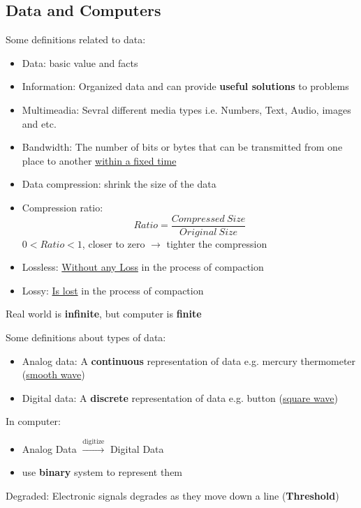 \documentclass[12pt]{article}
\begin{document}
\subsection{Data and Computers}
Some definitions related to data:
\begin{itemize}
    \item Data: basic value and facts
    \item Information: Organized data and can provide \textbf{useful solutions} to problems
    \item Multimeadia: Sevral different media types i.e. Numbers, Text, Audio, images and etc.
    \item Bandwidth: The number of bits or bytes that can be transmitted from one place to 
    another \underline{within a fixed time}
    \item Data compression: shrink the size of the data
    \item Compression ratio:
    \begin{equation}
        Ratio = \frac{Compressed\ Size}{Original\ Size}
    \end{equation}
    $0 < Ratio < 1$, closer to zero $\rightarrow$ tighter the compression
    \item Lossless: \underline{Without any Loss} in the process of compaction
    \item Lossy: \underline{Is lost} in the process of compaction
\end{itemize}

Real world is \textbf{infinite}, but computer is \textbf{finite}

Some definitions about types of data:
\begin{itemize}
    \item Analog data: A \textbf{continuous} representation of data
    e.g. mercury thermometer (\underline{smooth wave})
    \item Digital data: A \textbf{discrete} representation of data
    e.g. button (\underline{square wave})
\end{itemize}

In computer:
\begin{itemize}
    \item Analog Data $\xrightarrow{\text{digitize}}$ Digital Data 
    \item use \textbf{binary} system to represent them     
\end{itemize}

Degraded: Electronic signals degrades as they move down a line (\textbf{Threshold})
\end{document}
